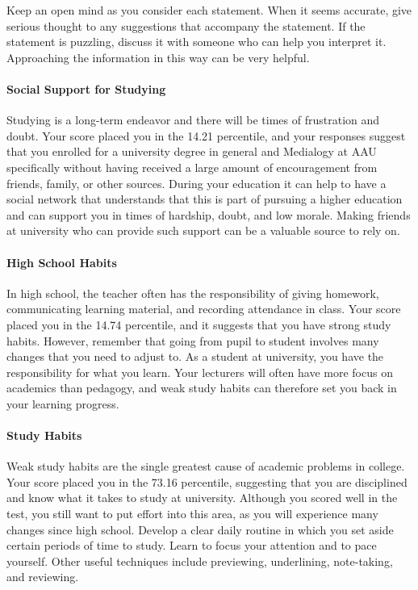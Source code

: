 \documentclass[]{article}
\let\oldparagraph\paragraph
\renewcommand{\paragraph}[1]{\oldparagraph{#1}\mbox{}}
\begin{document}
Keep an open mind as you consider each statement. When it seems
accurate, give serious thought to any suggestions that accompany the
statement. If the statement is puzzling, discuss it with someone who can
help you interpret it. Approaching the information in this way can be
very helpful.

\paragraph{Social Support for
Studying}\label{social-support-for-studying}

Studying is a long-term endeavor and there will be times of frustration
and doubt. Your score placed you in the 14.21 percentile, and your
responses suggest that you enrolled for a university degree in general
and Medialogy at AAU specifically without having received a large amount
of encouragement from friends, family, or other sources. During your
education it can help to have a social network that understands that
this is part of pursuing a higher education and can support you in times
of hardship, doubt, and low morale. Making friends at university who can
provide such support can be a valuable source to rely on.

\paragraph{High School Habits}\label{high-school-habits}

In high school, the teacher often has the responsibility of giving
homework, communicating learning material, and recording attendance in
class. Your score placed you in the 14.74 percentile, and it suggests
that you have strong study habits. However, remember that going from
pupil to student involves many changes that you need to adjust to. As a
student at university, you have the responsibility for what you learn.
Your lecturers will often have more focus on academics than pedagogy,
and weak study habits can therefore set you back in your learning
progress.

\paragraph{Study Habits}\label{study-habits}

Weak study habits are the single greatest cause of academic problems in
college. Your score placed you in the 73.16 percentile, suggesting that
you are disciplined and know what it takes to study at university.
Although you scored well in the test, you still want to put effort into
this area, as you will experience many changes since high school.
Develop a clear daily routine in which you set aside certain periods of
time to study. Learn to focus your attention and to pace yourself. Other
useful techniques include previewing, underlining, note-taking, and
reviewing.
\end{document}
